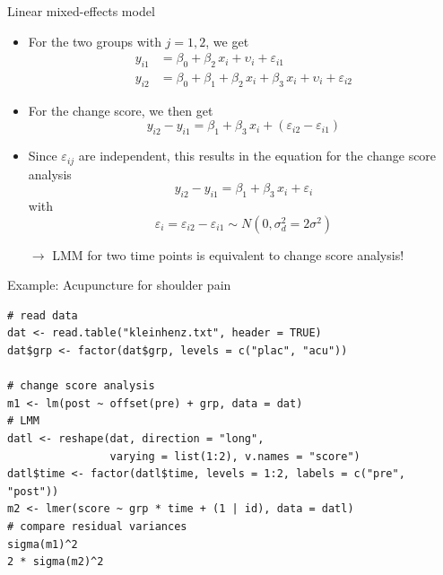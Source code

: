 \documentclass[aspectratio=169]{beamer}
\begin{document}
\begin{frame}[<+->]{Linear mixed-effects model}
\begin{itemize}
  \item For the two groups with $j = 1, 2$, we get
    \begin{align*}
      y_{i1} &= \beta_0 + \beta_2 \, x_i + \upsilon_i + \varepsilon_{i1}\\
      y_{i2} &= \beta_0 + \beta_1 + \beta_2 \, x_i + \beta_3 \, x_i + \upsilon_i + \varepsilon_{i2}
    \end{align*}
  \vspace{-.4cm}
  \item For the change score, we then get
    \[
      y_{i2} - y_{i1} = \beta_1 + \beta_3 \, x_i + (\varepsilon_{i2} - \varepsilon_{i1})
    \]
  \vspace{-.4cm}
  \item Since $\varepsilon_{ij}$ are independent, this results in the
    equation for the change score analysis
    \[
        y_{i2} - y_{i1} = \beta_1 + \beta_3 \, x_i + \varepsilon_{i}
    \]
    with
    \[
        \varepsilon_i = \varepsilon_{i2} - \varepsilon_{i1} \sim N(0, \sigma_d^2 = 2 \sigma^2)
    \]
  \item[$\to$] LMM for two time points is equivalent to change score analysis!
\end{itemize}
\end{frame}

\begin{frame}[fragile]{Example: Acupuncture for shoulder pain}
\begin{lstlisting}
# read data
dat <- read.table("kleinhenz.txt", header = TRUE)
dat$grp <- factor(dat$grp, levels = c("plac", "acu"))

# change score analysis
m1 <- lm(post ~ offset(pre) + grp, data = dat)
# LMM
datl <- reshape(dat, direction = "long",
                varying = list(1:2), v.names = "score")
datl$time <- factor(datl$time, levels = 1:2, labels = c("pre", "post"))
m2 <- lmer(score ~ grp * time + (1 | id), data = datl)
# compare residual variances
sigma(m1)^2
2 * sigma(m2)^2
\end{lstlisting}
\end{frame}
\end{document}
